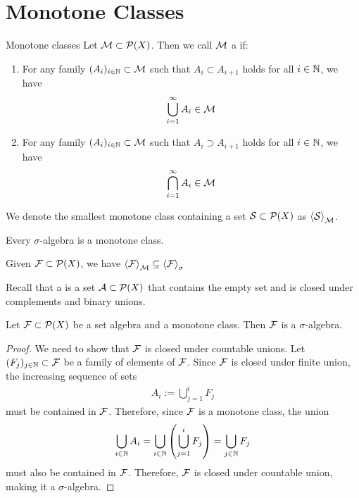 \section{Monotone Classes}
\begin{importantdefinition}{Monotone classes}{}
	Let $\mathcal{M} \subset \mathcal{P}(X)$. Then we call $\mathcal{M}$ a  if:
	\begin{enumerate}
		\item 
		For any family $(A_i)_{i \in \mathbb{N}} \subset \mathcal{M}$ such that $A_i \subset A_{i + 1}$ holds for all $i \in \mathbb{N}$, we have
		\begin{align*}
			\bigcup_{i = 1}^\infty A_i \in \mathcal{M}
		\end{align*}
		\item 
		For any family $(A_i)_{i \in \mathbb{N}} \subset \mathcal{M}$ such that $A_i \supset A_{i + 1}$ holds for all $i \in \mathbb{N}$, we have
		\begin{align*}
			\bigcap_{i = 1}^\infty A_i \in \mathcal{M}
		\end{align*}
	\end{enumerate}
	We denote the smallest monotone class containing a set $\mathcal{S} \subset \mathcal{P}(X)$ as $\left\langle \mathcal{S} \right\rangle_{\mathcal{M}}$.
\end{importantdefinition}
\begin{corollary}
	Every $\sigma$-algebra is a monotone class.
\end{corollary}
\begin{corollary}
	Given $\mathcal{F} \subset \mathcal{P}(X)$, we have $\left\langle \mathcal{F} \right\rangle_{\mathcal{M}} \subseteq \left\langle \mathcal{F} \right\rangle_\sigma$
\end{corollary}
Recall that a  is a set $\mathcal{A} \subset \mathcal{P}(X)$ that contains the empty set and is closed under complements and binary unions.
\begin{theorem}
	Let $\mathcal{F} \subset \mathcal{P}(X)$ be a set algebra and a monotone class. Then $\mathcal{F}$ is a $\sigma$-algebra.
\end{theorem}
\begin{proof}
	We need to show that $\mathcal{F}$ is closed under countable unions. Let $(F_j)_{j \in \mathbb{N}} \subset \mathcal{F}$ be a family of elements of $\mathcal{F}$. Since $\mathcal{F}$ is closed under finite union, the increasing sequence of sets
	\begin{align*}
		A_i := \bigcup_{j = 1}^i F_j 
	\end{align*}
	must be contained in $\mathcal{F}$. Therefore, since $\mathcal{F}$ is a monotone class, the union
	\begin{align*}
		\bigcup_{i \in \mathbb{N}} A_i = \bigcup_{i \in \mathbb{N}} \qty(\bigcup_{j = 1}^i F_j) = \bigcup_{j \in \mathbb{N}} F_j
	\end{align*}
	must also be contained in $\mathcal{F}$. Therefore, $\mathcal{F}$ is closed under countable union, making it a $\sigma$-algebra.
\end{proof}
